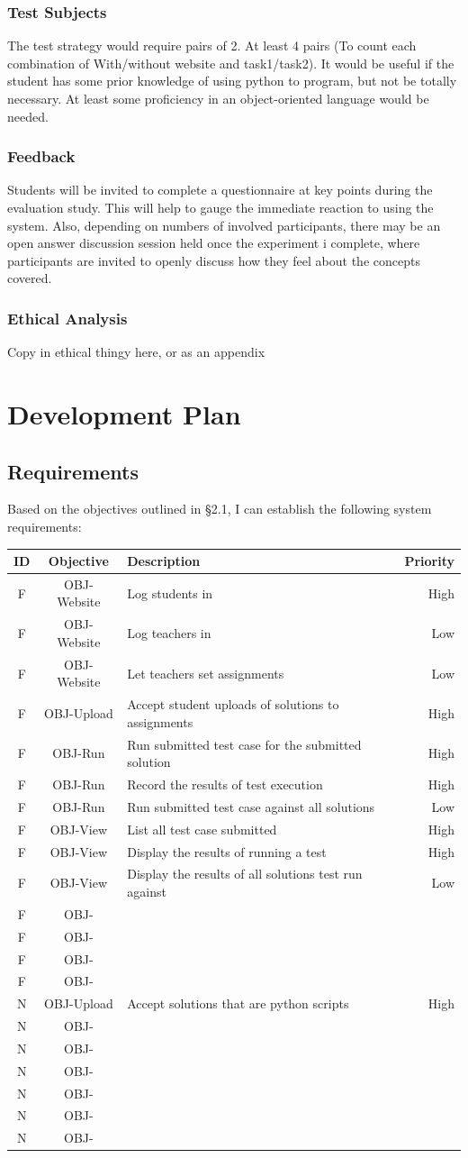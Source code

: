 \documentclass[a4paper,11pt]{report}
\newcounter{FunCount}
\newcounter{NFunCount}
\newcommand{\freq}[3]{\addtocounter{FunCount}{1}F\arabic{FunCount} & OBJ-#1 & #2 & #3\\}
\newcommand{\nfreq}[3]{\addtocounter{NFunCount}{1}N\arabic{NFunCount} & OBJ-#1 & #2 & #3\\}
\begin{document}
\subsection{Test Subjects}
The test strategy would require pairs of 2. At least 4 pairs (To count each combination of With/without website and task1/task2). It would be useful if the student has some prior knowledge of using python to program, but not be totally necessary. At least some proficiency in an object-oriented language would be needed.

\subsection{Feedback}
Students will be invited to complete a questionnaire at key points during the evaluation study. This will help to gauge the immediate reaction to using the system. Also, depending on numbers of involved participants, there may be an open answer discussion session held once the experiment i complete, where participants are invited to openly discuss how they feel about the concepts covered.

\subsection{Ethical Analysis}
Copy in ethical thingy here, or as an appendix

\chapter{Development Plan}

\section{Requirements}
Based on the objectives outlined in \S 2.1, I can establish the following system requirements:\par
\begin{longtable}{cclr}
\textbf{ID} & \textbf{Objective} & \textbf{Description} & \textbf{Priority}\\\hline
\freq{Website}{Log students in}{High}
\freq{Website}{Log teachers in}{Low}
\freq{Website}{Let teachers set assignments}{Low} %
\freq{Upload}{Accept student uploads of solutions to assignments}{High}
\freq{Run}{Run submitted test case for the submitted solution}{High}
\freq{Run}{Record the results of test execution}{High}
\freq{Run}{Run submitted test case against all solutions}{Low}
\freq{View}{List all test case submitted}{High}
\freq{View}{Display the results of running a test}{High}
\freq{View}{Display the results of all solutions test run against}{Low}
\freq{}{}{}
\freq{}{}{}
\freq{}{}{}
\freq{}{}{}
\nfreq{Upload}{Accept solutions that are python scripts}{High}
\nfreq{}{}{}
\nfreq{}{}{}
\nfreq{}{}{}
\nfreq{}{}{}
\nfreq{}{}{}
\nfreq{}{}{}
\end{longtable}
\end{document}
